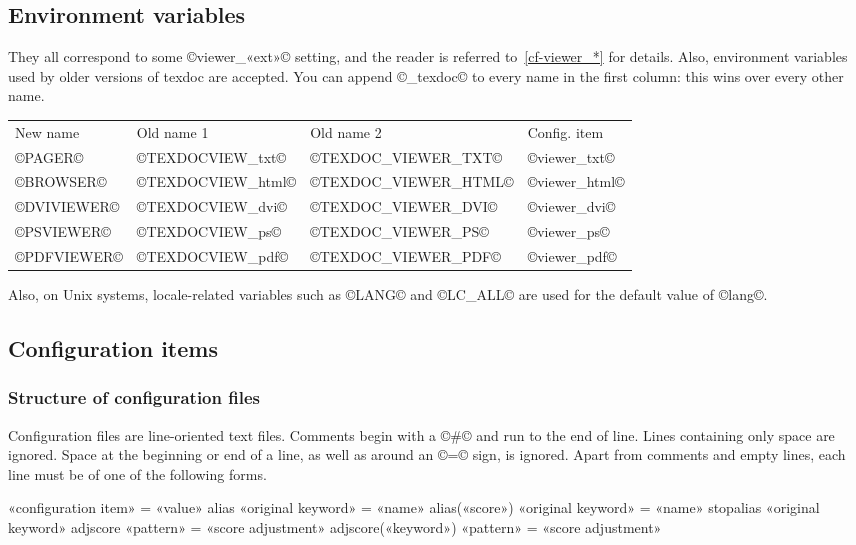 \documentclass[a4paper, oneside]{scrartcl}
\makeatletter
\newenvironment{htcode}{%
  \SaveVerbatim[samepage, gobble=2]{verbmat}%
  }{%
  \endSaveVerbatim
  \par\medskip\noindent\hspace*{\parindent}%
  \BUseVerbatim{verbmat}%
  \par\medskip\@endpetrue}
\makeatother
\begin{document}
\subsection{Environment variables}\label{ss-envvar}

They all correspond to some ©viewer_«ext»© setting, and the reader is referred
to~\ref{cf-viewer_*} for details. Also, environment variables used by older
versions of texdoc are accepted. You can append ©_texdoc© to every name in
the first column: this wins over every other name.

\begin{center}
  \begin{tabular}{*4l}
    New name    & Old name 1        & Old name 2           & Config. item  \\
    ©PAGER©     & ©TEXDOCVIEW_txt©  & ©TEXDOC_VIEWER_TXT©  & ©viewer_txt©  \\
    ©BROWSER©   & ©TEXDOCVIEW_html© & ©TEXDOC_VIEWER_HTML© & ©viewer_html© \\
    ©DVIVIEWER© & ©TEXDOCVIEW_dvi©  & ©TEXDOC_VIEWER_DVI©  & ©viewer_dvi©  \\
    ©PSVIEWER©  & ©TEXDOCVIEW_ps©   & ©TEXDOC_VIEWER_PS©   & ©viewer_ps©   \\
    ©PDFVIEWER© & ©TEXDOCVIEW_pdf©  & ©TEXDOC_VIEWER_PDF©  & ©viewer_pdf©  \\
  \end{tabular}
\end{center}

Also, on Unix systems, locale-related variables such as ©LANG© and ©LC_ALL©
are used for the default value of ©lang©.

\subsection{Configuration items}\label{ss-conf}

\subsubsection{Structure of configuration files}\label{sss-sonf-struct}

Configuration files are line-oriented text files. Comments begin with a ©#©
and run to the end of line. Lines containing only space are ignored. Space at
the beginning or end of a line, as well as around an ©=© sign, is ignored.
Apart from comments and empty lines, each line must be of one of the following
forms.

\begin{htcode}
  «configuration item» = «value»
  alias «original keyword» = «name»
  alias(«score») «original keyword» = «name»
  stopalias «original keyword»
  adjscore «pattern» = «score adjustment»
  adjscore(«keyword») «pattern» = «score adjustment»
\end{htcode}
\end{document}
